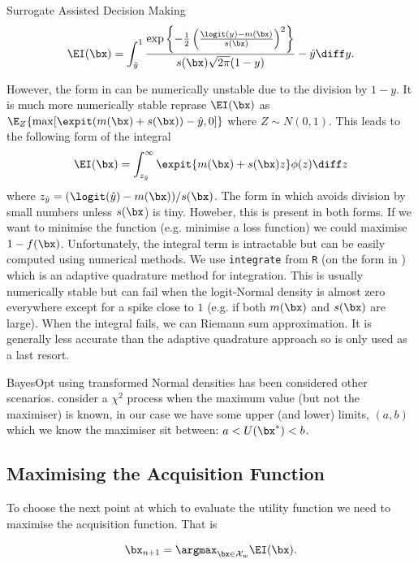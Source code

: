 \begin{chapter}{Surrogate Assisted Decision Making \label{Chap:optimisation}}
\begin{equation}
  \EI(\bx) = \int_{\hat{y}}^1 \frac{\exp \left\{  -\frac{1}{2}\left( \frac{\logit(y) - m(\bx)}{s(\bx)}\right) ^2 \right\}}{s(\bx)\sqrt{2 \pi} (1 - y)} - \hat{y} \diff y. \label{Eq:EI-logitn}
\end{equation}

However, the form in  can be numerically unstable due to the division by $1-y$. It is much more numerically stable reprase $\EI(\bx)$ as $\E_Z \{ \max [  \expit(m(\bx) + s(\bx)) - \hat{y}, 0 ] \} $ where $Z \sim N(0,1)$. This leads to the following form of the integral
\begin{equation}
  \EI(\bx) = \int_{z_{\hat{y}}}^{\infty} \expit\{m(\bx) + s(\bx)z\} \phi(z) \diff z \label{Eq:EI-logitn2}
\end{equation}
 where $z_{\hat{y}} = (\logit (\hat{y} )- m(\bx))/s(\bx)$. The form in  which avoids division by small numbers unless $s(\bx$) is tiny. Howeber, this is present in both forms.
If we want to minimise the function (e.g. minimise a loss function) we could maximise $1-f(\bx)$. Unfortunately, the integral term is intractable but can be easily computed using numerical methods. We use \verb|integrate| from \verb|R| (on the form in ) which is an adaptive quadrature method for integration. This is usually numerically stable but can fail when the logit-Normal density is almost zero everywhere except for a spike close to $1$ (e.g. if both $m(\bx)$ and $s(\bx)$ are large). When the integral fails, we can Riemann sum approximation. It is generally less accurate than the adaptive quadrature approach so is only used as a last resort.

BayesOpt using transformed Normal densities has been considered other scenarios. \citet{Nguyen2020} consider a $\chi ^2$ process when the maximum value (but not the maximiser) is known, in our case we have some upper (and lower) limits, $(a,b)$ which we know the maximiser sit between: $a < U(\bx^{*}) < b$.
\subsection{Maximising the Acquisition Function}

To choose the next point at which to evaluate the utility function we need to maximise the acquisition function. That is

\begin{equation}
  \bx_{n+1} = \argmax_{\bx \in \mathcal{X}_w} \EI(\bx).
\end{equation}


\end{chapter}
